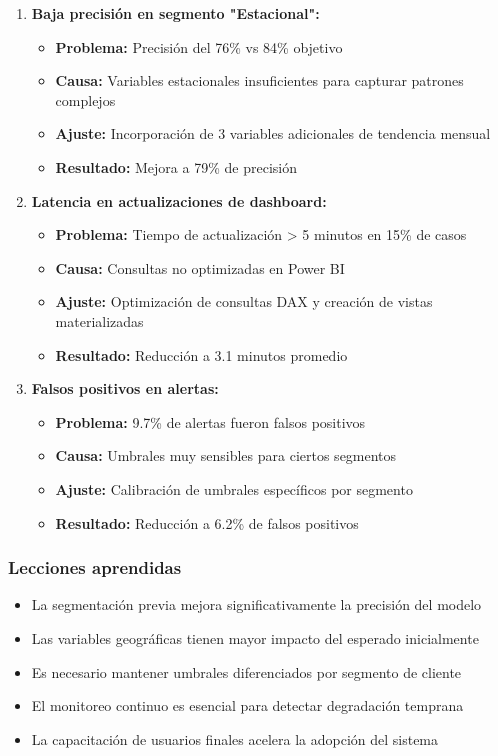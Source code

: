 \begin{enumerate}
    \item \textbf{Baja precisión en segmento "Estacional":}
    \begin{itemize}
        \item \textbf{Problema:} Precisión del 76\% vs 84\% objetivo
        \item \textbf{Causa:} Variables estacionales insuficientes para capturar patrones complejos
        \item \textbf{Ajuste:} Incorporación de 3 variables adicionales de tendencia mensual
        \item \textbf{Resultado:} Mejora a 79\% de precisión
    \end{itemize}
    
    \item \textbf{Latencia en actualizaciones de dashboard:}
    \begin{itemize}
        \item \textbf{Problema:} Tiempo de actualización > 5 minutos en 15\% de casos
        \item \textbf{Causa:} Consultas no optimizadas en Power BI
        \item \textbf{Ajuste:} Optimización de consultas DAX y creación de vistas materializadas
        \item \textbf{Resultado:} Reducción a 3.1 minutos promedio
    \end{itemize}
    
    \item \textbf{Falsos positivos en alertas:}
    \begin{itemize}
        \item \textbf{Problema:} 9.7\% de alertas fueron falsos positivos
        \item \textbf{Causa:} Umbrales muy sensibles para ciertos segmentos
        \item \textbf{Ajuste:} Calibración de umbrales específicos por segmento
        \item \textbf{Resultado:} Reducción a 6.2\% de falsos positivos
    \end{itemize}
\end{enumerate}

\subsubsection{Lecciones aprendidas}

\begin{itemize}
    \item La segmentación previa mejora significativamente la precisión del modelo
    \item Las variables geográficas tienen mayor impacto del esperado inicialmente
    \item Es necesario mantener umbrales diferenciados por segmento de cliente
    \item El monitoreo continuo es esencial para detectar degradación temprana
    \item La capacitación de usuarios finales acelera la adopción del sistema
\end{itemize}


